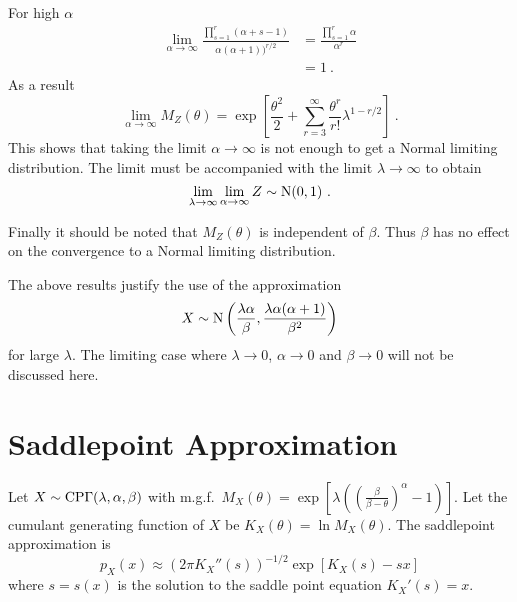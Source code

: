 For high $\alpha$
\begin{align}
  \lim_{\alpha\rightarrow\infty}
  \frac{
    \prod_{s=1}^r(\alpha+s-1)
  }
  {
    \alpha(\alpha+1))^{r/2}
  }
  &=
  \frac{
    \prod_{s=1}^r\alpha
  }
  {
    \alpha^{r}
  }
  \nonumber\\
  &= 1
  \ .
\end{align}
As a result
\begin{equation}
  \lim_{\alpha\rightarrow\infty}
  M_Z(\theta)=
  \exp\left[
    \frac{\theta^2}{2}
    +\sum_{r=3}^\infty
    \frac{\theta^r}{r!}
    \lambda^{1-r/2}
  \right]
  \ .
\end{equation}
This shows that taking the limit $\alpha\rightarrow\infty$ is not enough to get a Normal limiting distribution. The limit must be accompanied with the limit $\lambda\rightarrow\infty$ to obtain
\begin{equation}
  \lim_{\lambda\rightarrow\infty}\lim_{\alpha\rightarrow\infty}Z\sim\operatorname{N}(0,1)
  \ .
\end{equation}

Finally it should be noted that $M_Z(\theta)$ is independent of $\beta$. Thus $\beta$ has no effect on the convergence to a Normal limiting distribution.

The above results justify the use of the approximation
\begin{equation}
  X\sim\operatorname{N}\left(\frac{\lambda\alpha}{\beta},\frac{\lambda\alpha(\alpha+1)}{\beta^2}\right)
\end{equation}
for large $\lambda$. The limiting case where $\lambda\rightarrow 0$, $\alpha\rightarrow 0$ and $\beta\rightarrow 0$ will not be discussed here.

\section{Saddlepoint Approximation}
\label{chapter:appendix_saddlepoint}
Let $X\sim\operatorname{CP\Gamma}(\lambda,\alpha,\beta)$ with m.g.f.~$M_X(\theta)=\exp\left[\lambda\left(\left(\frac{\beta}{\beta-\theta}\right)^{\alpha}-1\right)\right]$. Let the cumulant generating function of $X$ be $K_X(\theta)=\ln M_X(\theta)$. The saddlepoint approximation is 
\begin{equation}
  p_X(x)\approx\left(2\pi K_X''(s)\right)^{-1/2}\exp\left[K_X(s)-sx\right]
  \label{eq:appendix_saddlepoint}
\end{equation}
where $s=s(x)$ is the solution to the saddle point equation $K_X'(s)=x$.

